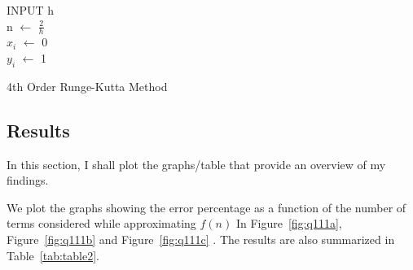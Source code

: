 \documentclass[titlepage, 11pt]{article}
\begin{document}
\begin{center}
\begin{algorithm}[H]\label{alg4}

\SetAlgoLined

INPUT h \\
n $\gets$ $\frac{2}{h}$ \\
$x_i$ $\gets$ 0\\
$y_i$ $\gets$ 1\\

 \caption{4th Order Runge-Kutta Method}
\end{algorithm}    
\end{center}
\subsection{Results}

In this section, I shall plot the graphs/table that provide an overview of my findings.

We plot the graphs showing the error percentage as a function of the number of terms considered while approximating $f(n)$ In Figure~\ref{fig:q111a}, Figure~\ref{fig:q111b} and Figure~\ref{fig:q111c} . The results are also summarized in Table~\ref{tab:table2}.
\end{document}
